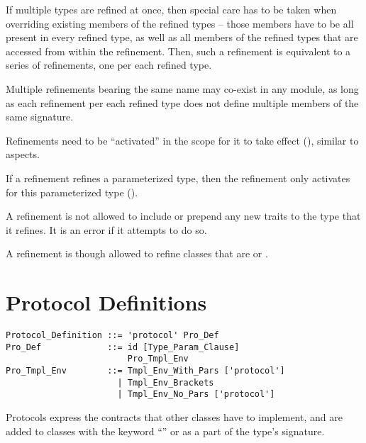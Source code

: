 If multiple types are refined at once, then special care has to be taken when overriding existing members of the refined types -- those members have to be all present in every refined type, as well as all members of the refined types that are accessed from within the refinement. Then, such a refinement is equivalent to a series of refinements, one per each refined type. 

Multiple refinements bearing the same name may co-exist in any module, as long as each refinement per each refined type does not define multiple members of the same signature. 

Refinements need to be ``activated'' in the scope for it to take effect (), similar to aspects.

If a refinement refines a parameterized type, then the refinement only activates for this parameterized type (). 

A refinement is not allowed to include or prepend any new traits to the type that it refines. It is an error if it attempts to do so. 

A refinement is though allowed to refine classes that are  or . 






\section{Protocol Definitions}
\label{sec:protocols}

\syntax\begin{lstlisting}
Protocol_Definition ::= 'protocol' Pro_Def
Pro_Def             ::= id [Type_Param_Clause]
                        Pro_Tmpl_Env
Pro_Tmpl_Env        ::= Tmpl_Env_With_Pars ['protocol']
                      | Tmpl_Env_Brackets
                      | Tmpl_Env_No_Pars ['protocol']
\end{lstlisting}

Protocols express the contracts that other classes have to implement, and are added to classes with the keyword ``'' or as a part of the type's signature. 

